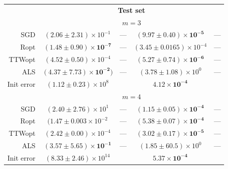 \begin{table}[]
\begin{tabular}{r|cc|cc|}
         & \multicolumn{4}{c|}{\textbf{Test set}} \\
         & \multicolumn{4}{c|}{$m = 3$} \\
         \hline

        SGD & $(2.06 \pm 2.31) \times 10^{-1}$ & --- &
        $\mathbf{(9.97 \pm 0.40) \times 10^{-5}}$ & --- \\
        Ropt & $\mathbf{(1.48 \pm 0.90) \times 10^{-7}}$ & --- &
        $(3.45 \pm 0.0165) \times 10^{-4}$ & --- \\
        TTWopt & $(4.52 \pm 0.50) \times 10^{-4}$ & --- &
        $\mathbf{(5.27 \pm 0.74) \times 10^{-6}}$& --- \\
        ALS & $\mathbf{(4.37 \pm 7.73) \times 10^{-2})}$ & --- &
        $(3.78 \pm 1.08) \times 10^{0}$ & --- \\
        \hline
        Init error & $(1.12 \pm 0.23) \times 10^{8}$ &  &
        $\mathbf{4.12 \times 10^{-4}}$ &  \\
        \hline


        & \multicolumn{4}{c|}{$m = 4$} \\

        \hline
        SGD & $(2.40 \pm 2.76) \times 10^{1}$ & --- &
        $\mathbf{(1.15 \pm 0.05) \times 10^{-4}}$ & ---\\
        Ropt & $(1.47 \pm 0.003 \times 10^{-2}$ & --- &
        $\mathbf{(5.38 \pm 0.07) \times 10^{-4}}$ & ---\\
        TTWopt & $(2.42 \pm 0.00) \times 10^{-4}$ & --- &
        $\mathbf{(3.02 \pm 0.17) \times 10^{-5}}$ & --- \\
        ALS & $\mathbf{(3.57 \pm 5.65) \times 10^{-1}}$ & --- &
        $(1.85 \pm 60.5) \times 10^{0}$ & ---\\
        \hline
        Init error & $(8.33 \pm 2.46) \times 10^{14}$ &  &
        $\mathbf{5.37 \times 10^{-4}}$ &  \\
        \hline


    \end{tabular}
\end{table}

